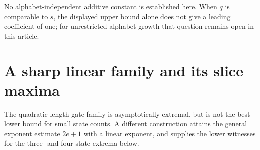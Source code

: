 \documentclass[11pt,letterpaper]{article}
\theoremstyle{definition}
\theoremstyle{remark}
\begin{document}
No alphabet-independent additive constant is established here. When $q$ is comparable to $s$, the displayed upper bound alone does not give a leading coefficient of one; for unrestricted alphabet growth that question remains open in this article.

\section{A sharp linear family and its slice maxima}\label{ccc:sc:sec:linear}

The quadratic length-gate family is asymptotically extremal, but is not the best lower bound for small state counts. A different construction attains the general exponent estimate $2e+1$ with a linear exponent, and supplies the lower witnesses for the three- and four-state extrema below.
\end{document}
